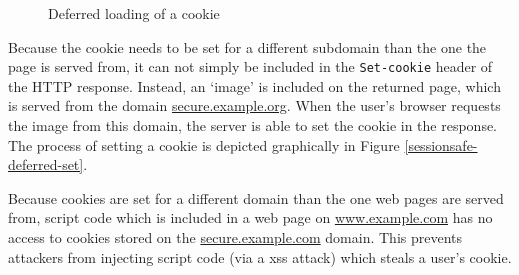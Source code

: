 \begin{figure}[ht]
	\centering
	\caption{Deferred loading of a cookie}
\end{figure}

Because the cookie needs to be set for a different subdomain than the one the page is served from, it can not simply be included in the \texttt{Set-cookie} header of the HTTP response. Instead, an `image' is included on the returned page, which is served from the domain \url{secure.example.org}. When the user's browser requests the image from this domain, the server is able to set the cookie in the response. The process of setting a cookie is depicted graphically in Figure \ref{sessionsafe-deferred-set}.

Because cookies are set for a different domain than the one web pages are served from, script code which is included in a web page on \url{www.example.com} has no access to cookies stored on the \url{secure.example.com} domain. This prevents attackers from injecting script code (via a \gls{xss} attack) which steals a user's cookie.

